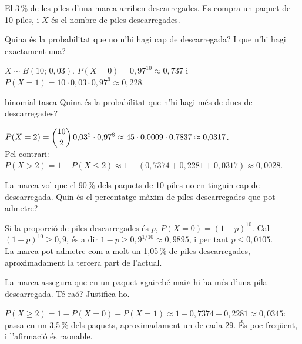 El 3\,\% de les piles d'una marca arriben descarregades. Es compra un paquet de 10 piles, i $X$ és el nombre
de piles descarregades.

\begin{apartats}

Quina és la probabilitat que no n'hi hagi cap de descarregada? I que n'hi hagi exactament una?

\begin{solucio}
$X\sim B(10;\,0{,}03)$. $P(X=0)=0{,}97^{10}\approx0{,}737$ i
$P(X=1)=10\cdot0{,}03\cdot0{,}97^{9}\approx0{,}228$.
\end{solucio}

\begin{tria}{binomial-tasca}
Quina és la probabilitat que n'hi hagi més de dues de descarregades?

\begin{solucio}
$P(X=2)=\dbinom{10}2\,0{,}03^2\cdot0{,}97^8\approx45\cdot0{,}0009\cdot0{,}7837\approx0{,}0317$.\\
Pel contrari: $P(X>2)=1-P(X\le2)\approx1-(0{,}7374+0{,}2281+0{,}0317)\approx0{,}0028$.
\end{solucio}

La marca vol que el 90\,\% dels paquets de 10 piles no en tinguin cap de descarregada. Quin és el
percentatge màxim de piles descarregades que pot admetre?

\begin{solucio}
Si la proporció de piles descarregades és $p$, $P(X=0)=(1-p)^{10}$. Cal $(1-p)^{10}\ge0{,}9$, és a dir
$1-p\ge0{,}9^{1/10}\approx0{,}9895$, i per tant $p\le0{,}0105$.\\
La marca pot admetre com a molt un 1,05\,\% de piles descarregades, aproximadament la tercera part de
l'actual.
\end{solucio}
\end{tria}

\begin{nomesllarg}
La marca assegura que en un paquet «gairebé mai» hi ha més d'una pila descarregada. Té raó? Justifica-ho.

\begin{solucio}
$P(X\ge2)=1-P(X=0)-P(X=1)\approx1-0{,}7374-0{,}2281\approx0{,}0345$: passa en un 3,5\,\% dels paquets,
aproximadament un de cada 29. És poc freqüent, i l'afirmació és raonable.
\end{solucio}
\end{nomesllarg}

\end{apartats}
